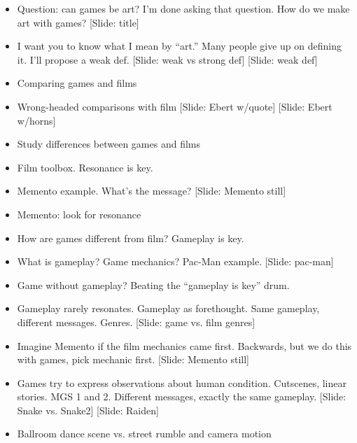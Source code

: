 \documentclass[12pt]{article}
\begin{document}
{\Huge

\begin{itemize}

\item Question:  can games be art?  I'm done asking that question.  How do we make art with games? [Slide: title]

\item I want you to know what I mean by ``art.''  Many people give up on defining it.  I'll propose a weak def.  [Slide: weak vs strong def] [Slide: weak def]

\item Comparing games and films

\item Wrong-headed comparisons with film [Slide: Ebert w/quote] [Slide: Ebert w/horns]

\item Study differences between games and films

\item Film toolbox.  Resonance is key.

\item Memento example.  What's the message?  [Slide:  Memento still]

\item Memento:  look for resonance

\item How are games different from film?  Gameplay is key.

\item What is gameplay?  Game mechanics?  Pac-Man example.  [Slide: pac-man]

\item Game without gameplay?  Beating the ``gameplay is key'' drum.

\item Gameplay rarely resonates.  Gameplay as forethought.  Same gameplay, different messages.  Genres.  [Slide:  game vs. film genres]

\item Imagine Memento if the film mechanics came first.  Backwards, but we do this with games, pick mechanic first.  [Slide:  Memento still]

\item Games try to express observations about human condition.  Cutscenes, linear stories.  MGS 1 and 2.  Different messages, exactly the same gameplay. [Slide:  Snake vs. Snake2] [Slide:  Raiden]

\item Ballroom dance scene vs. street rumble and camera motion


\end{itemize}}
\end{document}

